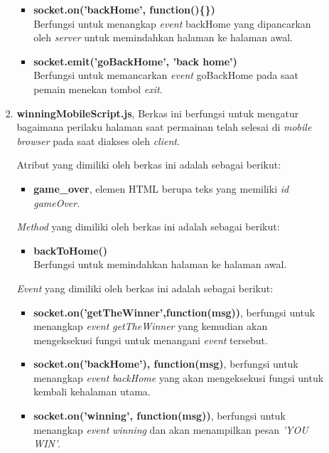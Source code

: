 \begin{enumerate}
\begin{enumerate}
\begin{enumerate}
\begin{itemize}
				\item \textbf{socket.on('backHome', function()\{\})}  \\
				Berfungsi untuk menangkap \textit{event} backHome yang dipancarkan oleh \textit{server} untuk memindahkan halaman ke halaman awal.
				
				\item \textbf{socket.emit('goBackHome', 'back home')} \\
				Berfungsi untuk memancarkan \textit{event} goBackHome pada saat pemain menekan tombol \textit{exit}. 
				 
			\end{itemize}
			
			\item \textbf{winningMobileScript.js}, Berkas ini berfungsi untuk mengatur bagaimana perilaku halaman saat permainan telah selesai di \textit{mobile browser} pada saat diakses oleh \textit{client}.
			
			Atribut yang dimiliki oleh berkas ini adalah sebagai berikut:
			\begin{itemize}
				\item \textbf{game\_over}, elemen HTML berupa teks yang memiliki \textit{id gameOver}.
			\end{itemize}
			
			\textit{Method} yang dimiliki oleh berkas ini adalah sebagai berikut:
			\begin{itemize}
				\item \textbf{backToHome()} \\
				Berfungsi untuk memindahkan halaman ke halaman awal.
			\end{itemize}
			
			\textit{Event} yang dimiliki oleh berkas ini adalah sebagai berikut:
			\begin{itemize}
				\item \textbf{socket.on('getTheWinner',function(msg){})}, berfungsi untuk menangkap \textit{event} \textit{getTheWinner} yang kemudian akan mengeksekusi fungsi untuk menangani \textit{event} tersebut.
				
				\item \textbf{socket.on('backHome'), function(msg){}}, berfungsi untuk menangkap \textit{event} \textit{backHome} yang akan mengeksekusi fungsi untuk kembali kehalaman utama.
				
				\item \textbf{socket.on('winning', function(msg){})}, berfungsi untuk menangkap \textit{event} \textit{winning} dan akan menampilkan pesan \textit{'YOU WIN'}.
				

\end{itemize}
\end{enumerate}
\end{enumerate}
\end{enumerate}
